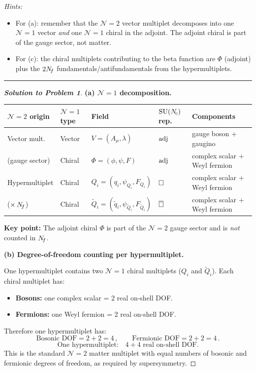\documentclass[11pt,a4paper]{article}
\begin{document}
\medskip

\noindent\textit{Hints:}
\begin{itemize}
  \item For (a): remember that the $\mathcal{N}=2$ vector multiplet
    decomposes into one $\mathcal{N}=1$ vector \emph{and} one
    $\mathcal{N}=1$ chiral in the adjoint.  The adjoint chiral is part
    of the gauge sector, not matter.
  \item For (c): the chiral multiplets contributing to the beta function
    are $\Phi$ (adjoint) plus the $2N_{\!f}$ fundamentals/antifundamentals
    from the hypermultiplets.
\end{itemize}

\bigskip
\hrule
\bigskip

\begin{proof}[\textbf{Solution to Problem 1}]

\textbf{(a) $\mathcal{N}=1$ decomposition.}

\renewcommand{\arraystretch}{1.3}
\begin{center}
\begin{tabular}{@{} l l l l l @{}}
\toprule
\textbf{$\mathcal{N}=2$ origin} & \textbf{$\mathcal{N}=1$ type}
  & \textbf{Field} & \textbf{$\mathrm{SU}(N_{\!c})$ rep.}
  & \textbf{Components} \\
\midrule
Vector mult.\ & Vector & $V = (A_\mu, \lambda)$
  & $\mathrm{adj}$ & gauge boson + gaugino \\
(gauge sector) & Chiral & $\Phi = (\phi, \psi, F)$
  & $\mathrm{adj}$ & complex scalar + Weyl fermion \\
\midrule
Hypermultiplet & Chiral & $Q_i = (q_i, \psi_{Q_i}, F_{Q_i})$
  & $\square$ & complex scalar + Weyl fermion \\
($\times\,N_{\!f}$) & Chiral & $\widetilde{Q}_i = (\tilde{q}_i, \psi_{\widetilde{Q}_i},
    F_{\widetilde{Q}_i})$
  & $\overline{\square}$ & complex scalar + Weyl fermion \\
\bottomrule
\end{tabular}
\end{center}

\textbf{Key point:} The adjoint chiral $\Phi$ is part of the
$\mathcal{N}=2$ gauge sector and is \emph{not} counted in $N_{\!f}$.

\bigskip

\textbf{(b) Degree-of-freedom counting per hypermultiplet.}

One hypermultiplet contains two $\mathcal{N}=1$ chiral multiplets
($Q_i$ and $\widetilde{Q}_i$).  Each chiral multiplet has:
\begin{itemize}
  \item \textbf{Bosons:} one complex scalar = 2 real on-shell DOF.
  \item \textbf{Fermions:} one Weyl fermion = 2 real on-shell DOF.
\end{itemize}
Therefore one hypermultiplet has:
\[
  \text{Bosonic DOF} = 2 + 2 = 4\,,
  \qquad
  \text{Fermionic DOF} = 2 + 2 = 4\,.
\]
\[
  \boxed{\text{One hypermultiplet:}\quad 4 + 4 \text{ real on-shell DOF.}}
\]
This is the standard $\mathcal{N}=2$ matter multiplet with equal numbers
of bosonic and fermionic degrees of freedom, as required by
supersymmetry.


\end{proof}
\end{document}

